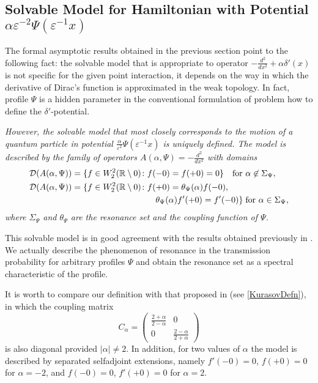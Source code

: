 \documentclass[11pt,english]{amsart}
\begin{document}
\subsection{Solvable Model for Hamiltonian  with Potential
$\alpha \varepsilon^{-2}\Psi(\varepsilon^{-1}x)$}\label{SubsecWhatIsDeltaPrime}

The formal asymptotic results obtained in the previous section point to the following fact:
the solvable model that is appropriate to operator $-\frac{d^2}{dx^2}+\alpha\delta'(x)$
is not specific for the given point interaction, it depends on the way in which  the derivative of Dirac's function is approximated in the weak topology. In fact,  profile $\Psi$ is a hidden parameter in the conventional formulation of problem how to define the $\delta'$-potential.

\emph{However, the solvable model that most closely corresponds to the motion of a quantum particle in potential $\frac{\alpha}{\varepsilon^{2}}\Psi(\varepsilon^{-1}x)$ is uniquely defined. The model is described by the family of operators $A(\alpha,\Psi)=-\frac{d^2}{dx^2}$ with domains
\begin{align*}
    &\mathcal{D}(A(\alpha,\Psi))=\{f\in W_2^2(\mathbb R\setminus 0)\colon f(-0)=f(+0)=0\} \quad\text{for } \alpha\not\in \Sigma_\Psi,\\
    &\mathcal{D}(A(\alpha,\Psi))=\{f\in W_2^2(\mathbb R\setminus 0)\colon f(+0)
=\theta_\Psi (\alpha)f(-0),\\ &\hskip5.2cm \theta_\Psi (\alpha)f'(+0)=f'(-0)\} \;\text{for
} \alpha\in \Sigma_\Psi,
\end{align*}
where $\Sigma_\Psi$ and $\theta_\Psi$ are the resonance set and the coupling function of
$\Psi$.}

This solvable model is in good agreement with the results obtained previously in
\cite{ChristianZolotarIermak03,ToyamaNogami, Zolotaryuk06, Zolotaryuk08}.
We actually describe the phenomenon of resonance in the transmission probability for arbitrary profiles $\Psi$
and obtain the resonance set as a spectral characteristic of the profile.

It is worth to compare our definition with that proposed in \cite{KurElaMSI93, NizhFAA2006} (see  \eqref{KurasovDefn}), in which the coupling matrix
\begin{equation*}\label{MatrixKurasov}
C_\alpha=\begin{pmatrix}\frac{2+\alpha}{2-\alpha} & 0\\ 0 & \frac{2-\alpha}{2+\alpha} \end{pmatrix}
\end{equation*}
is also diagonal provided $|\alpha|\neq 2$. In addition, for two values of $\alpha$ the model is described by
separated selfadjoint extensions, namely   $f'(-0)=0$,  $f(+0)=0$ for $\alpha=-2$, and
$f(-0)=0$, $f'(+0)=0$ for $\alpha=2$.
\end{document}
